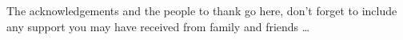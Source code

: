 The acknowledgements and the people to thank go here, don't forget to include any support you may have received from family and friends \ldots
